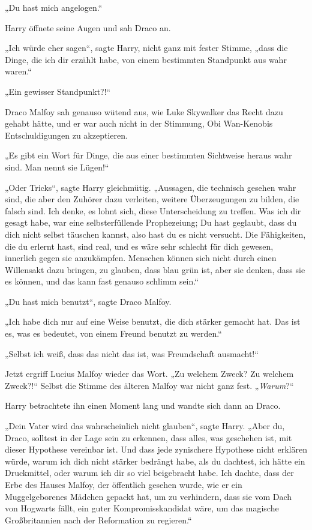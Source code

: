 {„Du hast mich angelogen.“

Harry öffnete seine Augen und sah Draco an.

„Ich würde eher sagen“, sagte Harry, nicht ganz mit fester Stimme, „dass die Dinge, die ich dir erzählt habe, von einem bestimmten Standpunkt aus wahr waren.“

„Ein gewisser Standpunkt?!“

Draco Malfoy sah genauso wütend aus, wie Luke Skywalker das Recht dazu gehabt hätte, und er war auch nicht in der Stimmung, Obi Wan-Kenobis Entschuldigungen zu akzeptieren.

„Es gibt ein Wort für Dinge, die aus einer bestimmten Sichtweise heraus wahr sind. Man nennt sie Lügen!“

„Oder Tricks“, sagte Harry gleichmütig. „Aussagen, die technisch gesehen wahr sind, die aber den Zuhörer dazu verleiten, weitere Überzeugungen zu bilden, die falsch sind. Ich denke, es lohnt sich, diese Unterscheidung zu treffen. Was ich dir gesagt habe, war eine selbsterfüllende Prophezeiung; Du hast geglaubt, dass du dich nicht selbst täuschen kannst, also hast du es nicht versucht. Die Fähigkeiten, die du erlernt hast, sind real, und es wäre sehr schlecht für dich gewesen, innerlich gegen sie anzukämpfen. Menschen können sich nicht durch einen Willensakt dazu bringen, zu glauben, dass blau grün ist, aber sie denken, dass sie es können, und das kann fast genauso schlimm sein.“

„Du hast mich benutzt“, sagte Draco Malfoy.

„Ich habe dich nur auf eine Weise benutzt, die dich stärker gemacht hat. Das ist es, was es bedeutet, von einem Freund benutzt zu werden.“

„Selbst ich weiß, dass das nicht das ist, was Freundschaft ausmacht!“

Jetzt ergriff Lucius Malfoy wieder das Wort. „Zu welchem Zweck? Zu welchem Zweck?!“ Selbst die Stimme des älteren Malfoy war nicht ganz fest. „\emph{Warum}?“

Harry betrachtete ihn einen Moment lang und wandte sich dann an Draco.

„Dein Vater wird das wahrscheinlich nicht glauben“, sagte Harry. „Aber du, Draco, solltest in der Lage sein zu erkennen, dass alles, was geschehen ist, mit dieser Hypothese vereinbar ist. Und dass jede zynischere Hypothese nicht erklären würde, warum ich dich nicht stärker bedrängt habe, als du dachtest, ich hätte ein Druckmittel, oder warum ich dir so viel beigebracht habe. Ich dachte, dass der Erbe des Hauses Malfoy, der öffentlich gesehen wurde, wie er ein Muggelgeborenes Mädchen gepackt hat, um zu verhindern, dass sie vom Dach von Hogwarts fällt, ein guter Kompromisskandidat wäre, um das magische Großbritannien nach der Reformation zu regieren.“

}

